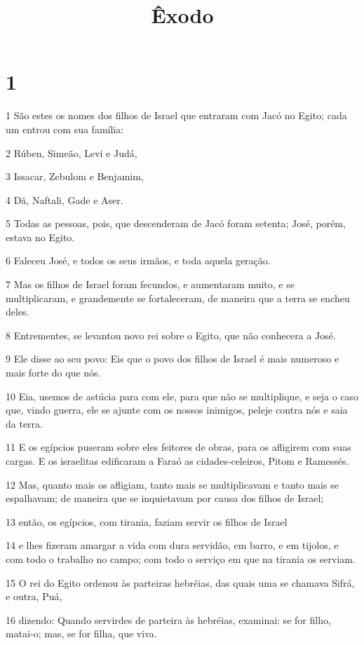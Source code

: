 

\title{Êxodo}


\chapter{1}

\par 1 São estes os nomes dos filhos de Israel que entraram com Jacó no Egito; cada um entrou com sua família:
\par 2 Rúben, Simeão, Levi e Judá,
\par 3 Issacar, Zebulom e Benjamim,
\par 4 Dã, Naftali, Gade e Aser.
\par 5 Todas as pessoas, pois, que descenderam de Jacó foram setenta; José, porém, estava no Egito.
\par 6 Faleceu José, e todos os seus irmãos, e toda aquela geração.
\par 7 Mas os filhos de Israel foram fecundos, e aumentaram muito, e se multiplicaram, e grandemente se fortaleceram, de maneira que a terra se encheu deles.
\par 8 Entrementes, se levantou novo rei sobre o Egito, que não conhecera a José.
\par 9 Ele disse ao seu povo: Eis que o povo dos filhos de Israel é mais numeroso e mais forte do que nós.
\par 10 Eia, usemos de astúcia para com ele, para que não se multiplique, e seja o caso que, vindo guerra, ele se ajunte com os nossos inimigos, peleje contra nós e saia da terra.
\par 11 E os egípcios puseram sobre eles feitores de obras, para os afligirem com suas cargas. E os israelitas edificaram a Faraó as cidades-celeiros, Pitom e Ramessés.
\par 12 Mas, quanto mais os afligiam, tanto mais se multiplicavam e tanto mais se espalhavam; de maneira que se inquietavam por causa dos filhos de Israel;
\par 13 então, os egípcios, com tirania, faziam servir os filhos de Israel
\par 14 e lhes fizeram amargar a vida com dura servidão, em barro, e em tijolos, e com todo o trabalho no campo; com todo o serviço em que na tirania os serviam.
\par 15 O rei do Egito ordenou às parteiras hebréias, das quais uma se chamava Sifrá, e outra, Puá,
\par 16 dizendo: Quando servirdes de parteira às hebréias, examinai: se for filho, matai-o; mas, se for filha, que viva.
